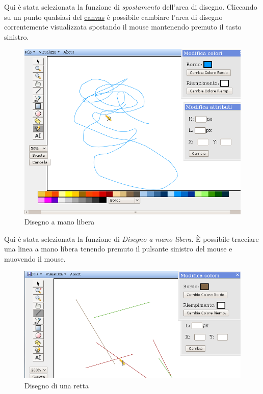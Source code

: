 \vspace{300pt}
Qui \`e stata selezionata la funzione di \textit{spostamento} dell'area di disegno. Cliccando su un punto qualsiasi del \underline{canvas} \`e possibile cambiare l'area di disegno correntemente visualizzata spostando il mouse mantenendo premuto il tasto sinistro.

\begin{figure}[!ht]
\centering
\includegraphics[scale=0.5]{images/matita.png}
\caption{Disegno a mano libera}
\end{figure} 

\newpage

\vspace{300pt}
Qui \`e stata selezionata la funzione di \textit{Disegno a mano libera}. \`E possibile tracciare una linea a mano libera tenendo premuto il pulsante sinistro del mouse e muovendo il mouse. 

\begin{figure}[!ht]
\centering
\includegraphics[scale=0.5]{images/linea.png}
\caption{Disegno di una retta}
\end{figure} 

